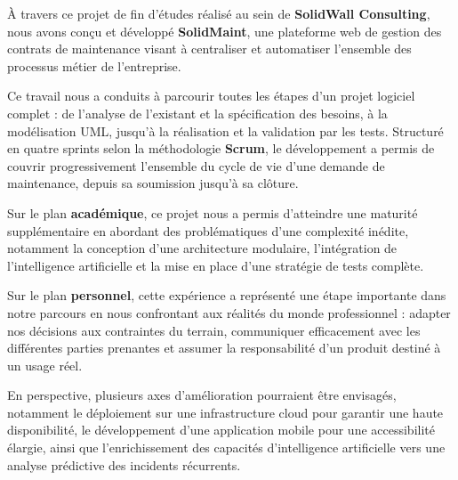 \newpage
\thispagestyle{fancy}
{}
\mtcaddchapter
{}

\begin{center}
\vspace*{0.5cm}
\vspace{0.8cm}
\end{center}

\justifying
À travers ce projet de fin d'études réalisé au sein de \textbf{SolidWall Consulting}, nous avons conçu et développé \textbf{SolidMaint}, une plateforme web de gestion des contrats de maintenance visant à centraliser et automatiser l'ensemble des processus métier de l'entreprise.

\medskip

Ce travail nous a conduits à parcourir toutes les étapes d'un projet logiciel complet : de l'analyse de l'existant et la spécification des besoins, à la modélisation UML, jusqu'à la réalisation et la validation par les tests. Structuré en quatre sprints selon la méthodologie \textbf{Scrum}, le développement a permis de couvrir progressivement l'ensemble du cycle de vie d'une demande de maintenance, depuis sa soumission jusqu'à sa clôture.

\medskip

Sur le plan \textbf{académique}, ce projet nous a permis d'atteindre une maturité supplémentaire en abordant des problématiques d'une complexité inédite, notamment la conception d'une architecture modulaire, l'intégration de l'intelligence artificielle et la mise en place d'une stratégie de tests complète.

\medskip

Sur le plan \textbf{personnel}, cette expérience a représenté une étape importante dans notre parcours en nous confrontant aux réalités du monde professionnel : adapter nos décisions aux contraintes du terrain, communiquer efficacement avec les différentes parties prenantes et assumer la responsabilité d'un produit destiné à un usage réel.

\medskip

En perspective, plusieurs axes d'amélioration pourraient être envisagés, notamment le déploiement sur une infrastructure cloud pour garantir une haute disponibilité, le développement d'une application mobile pour une accessibilité élargie, ainsi que l'enrichissement des capacités d'intelligence artificielle vers une analyse prédictive des incidents récurrents.